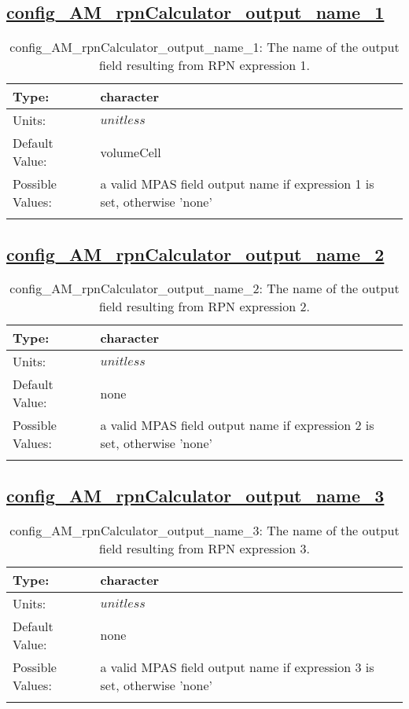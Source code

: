 \subsection[config\_AM\_rpnCalculator\_output\_name\_1]{\hyperref[sec:nm_tab_AM_rpnCalculator]{config\_AM\_rpnCalculator\_output\_name\_1}}
\label{subsec:nm_sec_config_AM_rpnCalculator_output_name_1}
\begin{center}
\begin{longtable}{| p{2.0in} || p{4.0in} |}
    \hline
    Type: & character \\
    \hline
    Units: & $unitless$ \\
    \hline
    Default Value: & volumeCell \\
    \hline
    Possible Values: & a valid MPAS field output name if expression 1 is set, otherwise 'none' \\
    \hline
    \caption{config\_AM\_rpnCalculator\_output\_name\_1: The name of the output field resulting from RPN expression 1.}
\end{longtable}
\end{center}
\subsection[config\_AM\_rpnCalculator\_output\_name\_2]{\hyperref[sec:nm_tab_AM_rpnCalculator]{config\_AM\_rpnCalculator\_output\_name\_2}}
\label{subsec:nm_sec_config_AM_rpnCalculator_output_name_2}
\begin{center}
\begin{longtable}{| p{2.0in} || p{4.0in} |}
    \hline
    Type: & character \\
    \hline
    Units: & $unitless$ \\
    \hline
    Default Value: & none \\
    \hline
    Possible Values: & a valid MPAS field output name if expression 2 is set, otherwise 'none' \\
    \hline
    \caption{config\_AM\_rpnCalculator\_output\_name\_2: The name of the output field resulting from RPN expression 2.}
\end{longtable}
\end{center}
\subsection[config\_AM\_rpnCalculator\_output\_name\_3]{\hyperref[sec:nm_tab_AM_rpnCalculator]{config\_AM\_rpnCalculator\_output\_name\_3}}
\label{subsec:nm_sec_config_AM_rpnCalculator_output_name_3}
\begin{center}
\begin{longtable}{| p{2.0in} || p{4.0in} |}
    \hline
    Type: & character \\
    \hline
    Units: & $unitless$ \\
    \hline
    Default Value: & none \\
    \hline
    Possible Values: & a valid MPAS field output name if expression 3 is set, otherwise 'none' \\
    \hline
    \caption{config\_AM\_rpnCalculator\_output\_name\_3: The name of the output field resulting from RPN expression 3.}
\end{longtable}
\end{center}
